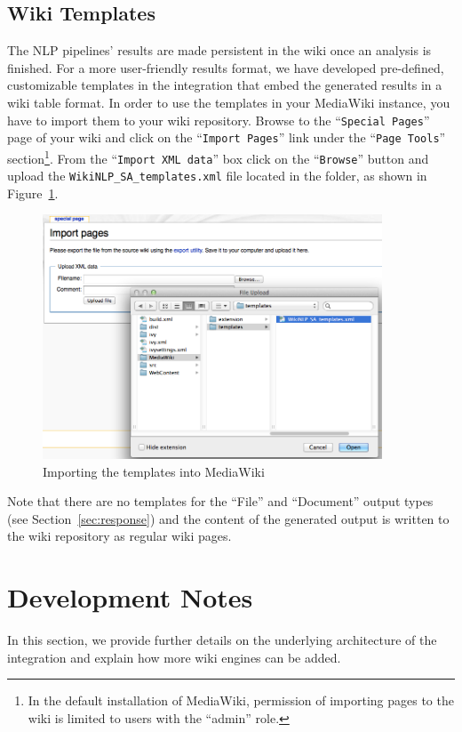 \subsection{Wiki Templates}
The NLP pipelines' results are made persistent in the wiki once an analysis is finished. For a more user-friendly results format, we have developed pre-defined, customizable templates in the \wikinlp integration that embed the generated results in a wiki table format. In order to use the templates in your MediaWiki instance, you have to import them to your wiki repository. Browse to the ``\texttt{Special Pages}'' page of your wiki and click on the ``\texttt{Import Pages}'' link under the ``\texttt{Page Tools}'' section\footnote{In the default installation of MediaWiki, permission of importing pages to the wiki is limited to users with the ``admin'' role.}. From the ``\texttt{Import XML data}'' box click on the ``\texttt{Browse}'' button and upload the \texttt{WikiNLP\_SA\_templates.xml} file located in the  folder, as shown in Figure~\ref{fig:wiki_template_import}.

\begin{figure}
\centering
\includegraphics[width=0.9\textwidth]{pictures/wiki_template_import.png}
\caption{Importing the \sa templates into MediaWiki}
\label{fig:wiki_template_import}
\end{figure}

Note that there are no templates for the ``File'' and ``Document'' output types (see Section~\ref{sec:response}) and the content of the generated output is written to the wiki repository as regular wiki pages.

\section{Development Notes}
In this section, we provide further details on the underlying architecture of the \wikinlp integration and explain how more wiki engines can be added.

